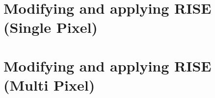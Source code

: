 \section{Modifying and applying RISE (Single Pixel)}

\section{Modifying and applying RISE (Multi Pixel)}
